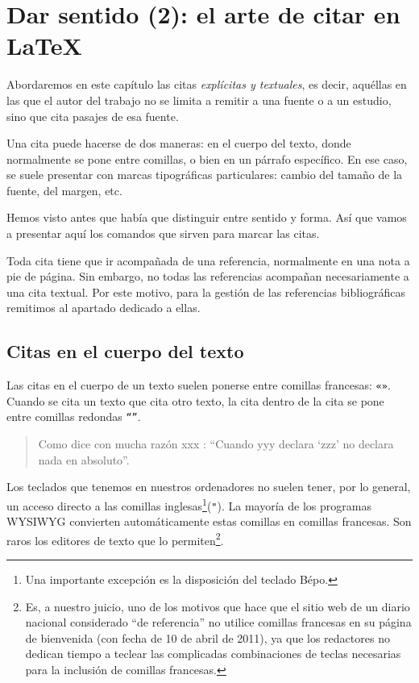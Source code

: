 \chapter{Dar sentido (2): el arte de citar en LaTeX}\label{citertexte}

\begin{intro}
Abordaremos en este capítulo las citas \emph{explícitas y textuales}, es decir, aquéllas en las que el autor del trabajo no se limita a remitir a una fuente o a un estudio, sino que cita pasajes de esa fuente.

Una cita puede hacerse de dos maneras: en el cuerpo del texto, donde normalmente se pone entre comillas, o bien en un párrafo específico. En ese caso, se suele presentar con marcas tipográficas particulares: cambio del tamaño de la fuente, del margen, etc.

Hemos visto antes que había que distinguir entre sentido y forma. Así que vamos a presentar aquí los comandos que sirven para marcar las citas.

\end{intro}
\begin{attention}
Toda cita tiene que ir acompañada de una referencia, normalmente en una nota a pie de página. Sin embargo, no todas las referencias acompañan necesariamente a una cita textual. Por este motivo, para la gestión de las referencias bibliográficas remitimos al apartado dedicado a ellas.
\end{attention}

\section{Citas en el cuerpo del texto}\label{guillemets}

Las citas en el cuerpo de un texto suelen ponerse entre comillas francesas: \verb|«»|. Cuando se cita un texto que cita otro texto, la cita dentro de la cita se pone entre comillas redondas \verb|“”|. 

\begin{quotation}
    Como dice con mucha razón xxx : \enquote{Cuando yyy declara \enquote{zzz} no declara nada en absoluto}.
\end{quotation}

Los teclados que tenemos en nuestros ordenadores no suelen tener, por lo general, un acceso directo a las comillas inglesas\footnote{Una importante excepción es la disposición del teclado Bépo.}(\verb|"|). 
La mayoría de los programas WYSIWYG convierten automáticamente estas comillas en comillas francesas. Son raros los editores de texto que lo permiten\footnote{Es, a nuestro juicio, uno de los motivos que hace que el sitio web de un diario nacional considerado \enquote{de referencia} no utilice comillas francesas en su página de bienvenida (con fecha de 10 de abril de 2011), ya que los redactores no dedican tiempo a teclear las complicadas combinaciones de teclas necesarias para la inclusión de comillas francesas.}. 

